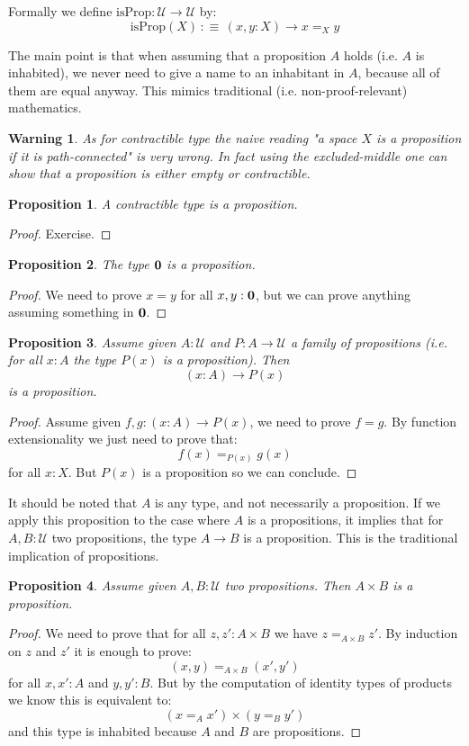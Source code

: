 \documentclass{article}
\newcommand{\U}{{\mathcal U}}
\renewcommand{\r}{\rightarrow}
\newcommand{\zero}{{\bf 0}}
\newtheorem{proposition}{Proposition}
\newtheorem{warning}{\danger Warning}
\begin{document}
Formally we define $\mathrm{isProp} : \U \r \U$ by: 
\[\mathrm{isProp}(X) \, :\equiv\,  (x,y:X)\r x=_X y\]

The main point is that when assuming that a proposition $A$ holds (i.e. $A$ is inhabited), we never need to give a name to an inhabitant in $A$, because all of them are equal anyway. This mimics traditional (i.e. non-proof-relevant) mathematics.

\begin{warning}
As for contractible type the naive reading "a space $X$ is a proposition if it is path-connected" is very wrong. In fact using the excluded-middle one can show that a proposition is either empty or contractible.
\end{warning}


\begin{proposition}
A contractible type is a proposition.
\end{proposition}
\begin{proof}
Exercise.
\end{proof}

\begin{proposition}
The type $\zero$ is a proposition.
\end{proposition}
\begin{proof}
We need to prove $x=y$ for all $x,y:\zero$, but we can prove anything assuming something in $\zero$.
\end{proof}

\begin{proposition}
Assume given $A:\U$ and $P:A\r \U$ a family of propositions (i.e. for all $x:A$ the type $P(x)$ is a proposition). Then 
\[(x:A)\r P(x)\]
is a proposition.
\end{proposition}
\begin{proof}
Assume given $f,g:(x:A)\r P(x)$, we need to prove $f=g$. By function extensionality we just need to prove that:
\[f(x)=_{P(x)}g(x)\]
for all $x:X$. But $P(x)$ is a proposition so we can conclude.
\end{proof}

It should be noted that $A$ is any type, and not necessarily a proposition. If we apply this proposition to the case where $A$ is a propositions, it implies that for $A,B:\U$ two propositions, the type $A\r B$ is a proposition. This is the traditional implication of propositions.

\begin{proposition}
Assume given $A,B:\U$ two propositions. Then $A\times B$ is a proposition.
\end{proposition}
\begin{proof}
We need to prove that for all $z,z':A\times B$ we have $z=_{A\times B} z'$. By induction on $z$ and $z'$ it is enough to prove:
\[(x,y)=_{A\times B}(x',y')\]
for all $x,x':A$ and $y,y':B$. But by the computation of identity types of products we know this is equivalent to:
\[(x=_Ax')\times (y=_By')\]
and this type is inhabited because $A$ and $B$ are propositions.
\end{proof}
\end{document}
